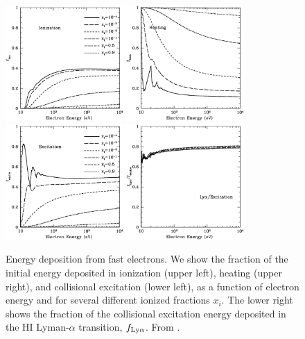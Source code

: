 \documentclass[a4paper,openany, 12pt]{book}
\begin{document}
\begin{figure}[]
\begin{center}
\includegraphics[width=0.4\textwidth]{figure2-5a} \includegraphics[width=0.4\textwidth]{figure2-5b} \\
\includegraphics[width=0.4\textwidth]{figure2-5c} \includegraphics[width=0.4\textwidth]{figure2-5d}
\end{center}
\caption{Energy deposition from fast electrons. We show the fraction of the initial energy deposited in ionization (upper left), heating (upper right), and collisional excitation (lower left), as a function of electron energy and for several different ionized fractions $x_i$. The lower right shows the fraction of the collisional excitation energy deposited in the HI Lyman-$\alpha$ transition, $f_{\rm Ly\alpha}$.  From \cite{furl10-xray}.}
\label{fig:xrayheat}
\end{figure}
\end{document}

